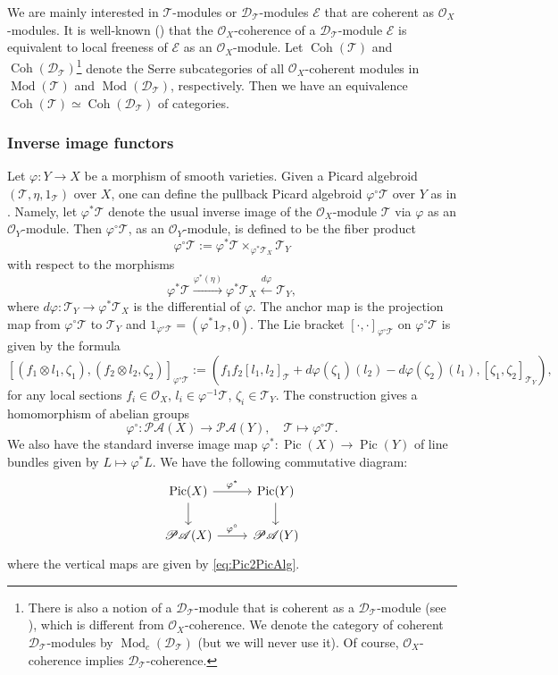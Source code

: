 \documentclass[11pt, a4paper]{amsart}
\newcommand{\cE}{\mathcal{E}}
\newcommand{\sD}{\mathscr{D}}
\DeclareMathOperator{\Pic}{Pic}
\DeclareMathOperator{\Mod}{Mod}
\DeclareMathOperator{\Coh}{Coh}
\newcommand{\T}{\mathcal{T}}
\newcommand{\TT}{\mathscr{T}}
\newcommand{\PicAlg}{\mathscr{PA}}
\newcommand{\OO}{\mathcal{O}}
\theoremstyle{definition}
\numberwithin{equation}{section}
\begin{document}
We are mainly interested in $\TT$-modules or $\sD_\TT$-modules $\cE$ that are coherent as $\OO_X$-modules. It is well-known (\cite[Lemma 2.3.1 (i)]{BeilinsonBernstein}) that the $\OO_X$-coherence of a $\sD_\TT$-module $\cE$ is equivalent to local freeness of $\cE$ as an $\OO_X$-module.  
Let $\Coh(\TT)$ and $\Coh(\sD_\TT)$\footnote{There is also a notion of a $\sD_\TT$-module that is coherent as a $\sD_\TT$-module (see \cite[Section 1.4]{HTT:D-modules}), which is different from $\OO_X$-coherence. We denote the category of coherent $\sD_\TT$-modules by $\Mod_c(\sD_\TT)$ (but we will never use it). Of course, $\OO_X$-coherence implies $\sD_\TT$-coherence.} denote the Serre subcategories of all $\OO_X$-coherent modules in $\Mod(\TT)$ and $\Mod(\sD_\TT)$, respectively. Then we have an equivalence $\Coh(\TT) \simeq \Coh(\sD_\TT)$ of categories.

\subsubsection{Inverse image functors} \label{subsubsec:pullback_pic}

Let $\varphi: Y \to X$ be a morphism of smooth varieties. Given a Picard algebroid $(\TT, \eta, 1_\TT)$ over $X$, one can define the pullback Picard algebroid $\varphi^{\circ} \TT$ over $Y$ as in \cite[Section 1.4.6 and 2.2]{BeilinsonBernstein}. Namely, let $\varphi^* \TT$ denote the usual inverse image of the $\OO_X$-module $\TT$ via $\varphi$ as an $\OO_Y$-module. Then $\varphi^{\circ} \TT$, as an $\OO_Y$-module, is defined to be the fiber product 
\begin{equation} \label{eq:pullbackTT}
	\varphi^{\circ} \TT := \varphi^* \TT \times_{\varphi^* \T_X} \T_Y 
\end{equation}
with respect to the morphisms 
\[ 
	\varphi^*\TT \xrightarrow{\varphi^*(\eta)} \varphi^* \T_X \xleftarrow{d \varphi} \T_Y, 
\] 
where $d \varphi: \T_Y \to \varphi^* \T_X$ is the differential of $\varphi$.
The anchor map is the projection map from $\varphi^{\circ} \TT$ to $\T_Y$ and $1_{\varphi^{\circ} \TT} = (\varphi^* 1_{\TT}, 0)$. The Lie bracket $[\cdot, \cdot]_{\varphi^{\circ} \TT}$ on $\varphi^{\circ} \TT$ is given by the formula
\[ 
	[ (f_1 \otimes l_1, \zeta_1),  (f_2 \otimes l_2, \zeta_2) ]_{\varphi^{\circ} \TT} := ( f_1 f_2 [l_1, l_2]_{\TT} + d\varphi(\zeta_1)(l_2) - d\varphi(\zeta_2)(l_1), [\zeta_1, \zeta_2]_{\T_Y} ), 
\]
for any local sections $f_i \in \OO_X$, $l_i \in \varphi^{-1}\TT$, $\zeta_i \in \T_Y$.
The construction gives a homomorphism of abelian groups
\[ 
	\varphi^\circ: \PicAlg(X) \to \PicAlg(Y), \quad \TT \mapsto \varphi^\circ \TT. 
\]
We also have the standard inverse image map $\varphi^*: \Pic(X) \to \Pic(Y)$ of line bundles given by $L \mapsto \varphi^* L$. We have the following commutative diagram:
\begin{equation} \label{diag:Pic2PicAlg_pullback}
	\begin{tikzcd}
		\Pic(X) \ar[r, "\varphi^*"] \ar[d] & \Pic(Y) \ar[d] \\
		\PicAlg(X) \ar[r, "\varphi^\circ"] & \PicAlg(Y)
	\end{tikzcd}
\end{equation}
where the vertical maps are given by \eqref{eq:Pic2PicAlg}.
\end{document}
